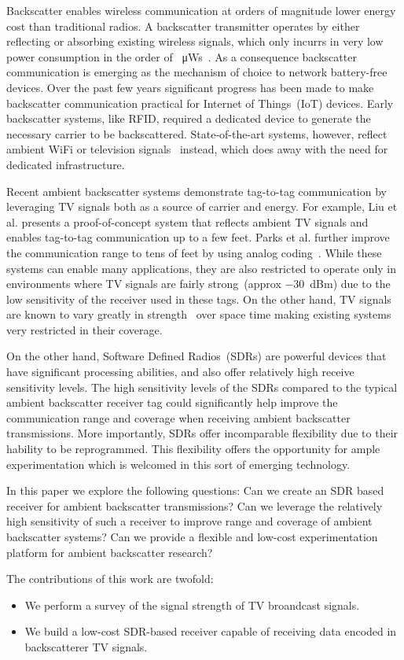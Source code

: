 Backscatter enables wireless communication at orders of magnitude lower
energy cost than traditional radios. A backscatter transmitter operates
by either reflecting or absorbing existing wireless signals, which only
incurrs in very low power consumption in the order of
\SI{}{\micro\watt}s~\cite{liu_ambient_2013}. As a consequence backscatter
communication is emerging as the mechanism of choice to network
battery-free devices.  Over the past few years significant progress has
been made to make backscatter communication practical for Internet of
Things~(IoT) devices. Early backscatter systems, like RFID, required a
dedicated device to generate the necessary carrier to be backscattered.
State-of-the-art systems, however, reflect ambient WiFi or television
signals~\cite{liu_ambient_2013} instead, which does away with the need for
dedicated infrastructure. 

Recent ambient backscatter systems demonstrate tag-to-tag communication
by leveraging TV signals both as a source of carrier and energy. For
example, Liu et al. presents a proof-of-concept system that reflects
ambient TV signals and enables tag-to-tag communication up to a few
feet. Parks et al. further improve the communication range to tens of
feet by using analog coding~\cite{parks_turbocharging_2014}.  While these
systems can enable many applications, they are also restricted to
operate only in environments where TV signals are fairly strong~(approx
\SI{-30}{dBm}) due to the low sensitivity of the receiver used in these
tags. On the other hand, TV signals are known to vary greatly in
strength~\cite{wang_fm_2017} over space time making existing systems very
restricted in their coverage.

On the other hand, Software Defined Radios~(SDRs) are powerful devices
that have significant processing abilities, and also offer relatively
high receive sensitivity levels. The high sensitivity levels of the SDRs
compared to the typical ambient backscatter receiver tag could
significantly help improve the communication range and coverage when
receiving ambient backscatter transmissions. More importantly, SDRs
offer incomparable flexibility due to their hability to be reprogrammed.
This flexibility offers the opportunity for ample experimentation which
is welcomed in this sort of emerging technology.

In this paper we explore the following questions: Can we create an SDR
based receiver for ambient backscatter transmissions? Can we leverage
the relatively high sensitivity of such a receiver to improve range and
coverage of ambient backscatter systems? Can we provide a flexible and
low-cost experimentation platform for ambient backscatter research?

 The contributions of this work are twofold:
\begin{itemize}
				\item We perform a survey of the signal strength of TV
								broandcast signals.

				\item We build a low-cost SDR-based receiver capable of
								receiving data encoded in backscatterer TV signals.
\end{itemize}

